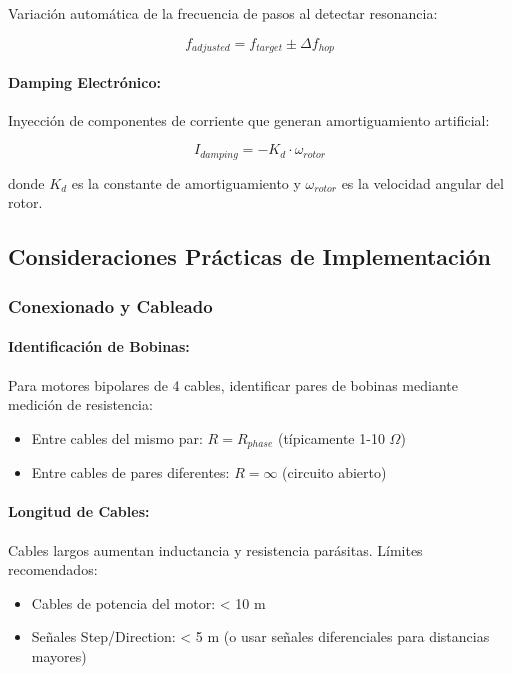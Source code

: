 Variación automática de la frecuencia de pasos al detectar resonancia:

\begin{equation}
f_{adjusted} = f_{target} \pm \Delta f_{hop}
\end{equation}

\paragraph{Damping Electrónico:}

Inyección de componentes de corriente que generan amortiguamiento artificial:

\begin{equation}
I_{damping} = -K_d \cdot \omega_{rotor}
\end{equation}

donde $K_d$ es la constante de amortiguamiento y $\omega_{rotor}$ es la velocidad angular del rotor.

\subsection{Consideraciones Prácticas de Implementación}

\subsubsection{Conexionado y Cableado}

\paragraph{Identificación de Bobinas:}

Para motores bipolares de 4 cables, identificar pares de bobinas mediante medición de resistencia:
\begin{itemize}
    \item Entre cables del mismo par: $R = R_{phase}$ (típicamente 1-10 $\Omega$)
    \item Entre cables de pares diferentes: $R = \infty$ (circuito abierto)
\end{itemize}

\paragraph{Longitud de Cables:}

Cables largos aumentan inductancia y resistencia parásitas. Límites recomendados:
\begin{itemize}
    \item Cables de potencia del motor: < 10 m
    \item Señales Step/Direction: < 5 m (o usar señales diferenciales para distancias mayores)
\end{itemize}

